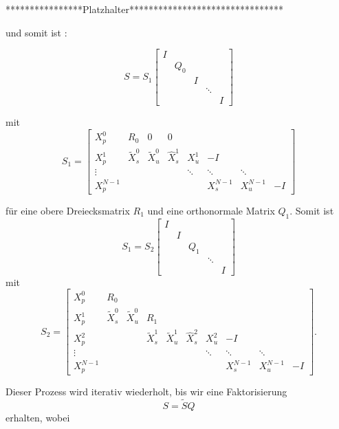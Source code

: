 ****************Platzhalter********************************

und somit ist :

$$S=S_1 \left[\begin{array}{ccccc}
I & & & & \\
 &Q_0 &  &  &  \\ 
 & & I &  &  \\ 
 & &  & \ddots &  \\ 
 & &  &  & I
\end{array}  \right]$$

mit 
$$S_1=\left[\begin{array}{cccccccc}
X_p^0 & R_0 & 0 & 0 &  &  &  &  \\ 
X_p^1 & \tilde{X}_s^0 & \tilde{X}_u^0 & \hat{X}_s^1 & X_u ^1  & -I &  &  \\ 
\vdots &  &  &  & \ddots & \ddots & \ddots &  \\ 
X_p^{N-1} &  &  &  &  & X_s^{N-1} & X_u^{N-1} & -I
\end{array}  \right]$$


für eine obere Dreiecksmatrix $R_1$ und eine orthonormale Matrix $Q_1$. Somit ist 
$$S_1=S_2
\left[\begin{array}{ccccc}
I & & & & \\
 &I &  &  &  \\ 
 & & Q_1 &  &  \\ 
 & &  & \ddots &  \\ 
 & &  &  & I
\end{array}  \right]$$ mit
$$S_2=\left[\begin{array}{cccccccccc}
X_p^0 & R_0 &  &  &  &  &  &  \\ 
X_p^1 & \tilde{X}_s^0 & \tilde{X}_u^0 & R_1 &  &  &  &  \\ 
X_p^2  & &  & \tilde{X}_s^1 & \tilde{X}_u^1 & \hat{X}_s^2 & X_u^2& -I  \\ 
\vdots &  &  & & & & \ddots & \ddots & \ddots &  \\ 
X_p^{N-1} &  &  & & & &  & X_s^{N-1} & X_u^{N-1} & -I
\end{array} \right].$$

Dieser Prozess wird iterativ wiederholt, bis wir eine Faktorisierung $$S=\tilde{S}Q$$ erhalten, wobei 

